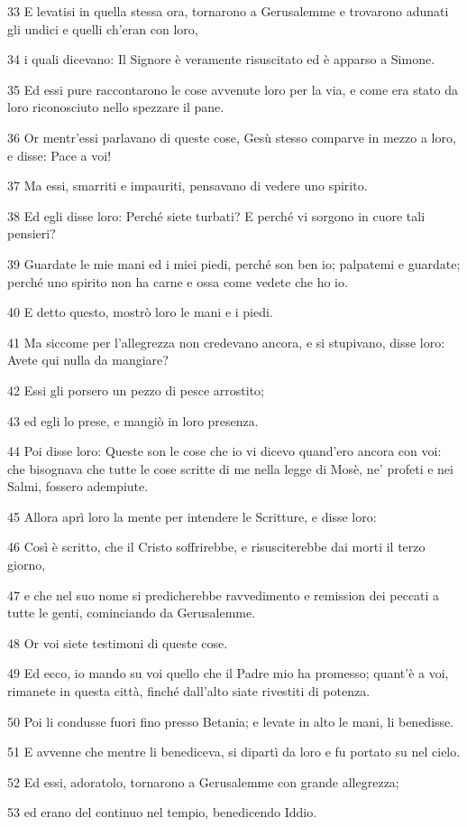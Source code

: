 \par 33 E levatisi in quella stessa ora, tornarono a Gerusalemme e trovarono adunati gli undici e quelli ch'eran con loro,
\par 34 i quali dicevano: Il Signore è veramente risuscitato ed è apparso a Simone.
\par 35 Ed essi pure raccontarono le cose avvenute loro per la via, e come era stato da loro riconosciuto nello spezzare il pane.
\par 36 Or mentr'essi parlavano di queste cose, Gesù stesso comparve in mezzo a loro, e disse: Pace a voi!
\par 37 Ma essi, smarriti e impauriti, pensavano di vedere uno spirito.
\par 38 Ed egli disse loro: Perché siete turbati? E perché vi sorgono in cuore tali pensieri?
\par 39 Guardate le mie mani ed i miei piedi, perché son ben io; palpatemi e guardate; perché uno spirito non ha carne e ossa come vedete che ho io.
\par 40 E detto questo, mostrò loro le mani e i piedi.
\par 41 Ma siccome per l'allegrezza non credevano ancora, e si stupivano, disse loro: Avete qui nulla da mangiare?
\par 42 Essi gli porsero un pezzo di pesce arrostito;
\par 43 ed egli lo prese, e mangiò in loro presenza.
\par 44 Poi disse loro: Queste son le cose che io vi dicevo quand'ero ancora con voi: che bisognava che tutte le cose scritte di me nella legge di Mosè, ne' profeti e nei Salmi, fossero adempiute.
\par 45 Allora aprì loro la mente per intendere le Scritture, e disse loro:
\par 46 Così è scritto, che il Cristo soffrirebbe, e risusciterebbe dai morti il terzo giorno,
\par 47 e che nel suo nome si predicherebbe ravvedimento e remission dei peccati a tutte le genti, cominciando da Gerusalemme.
\par 48 Or voi siete testimoni di queste cose.
\par 49 Ed ecco, io mando su voi quello che il Padre mio ha promesso; quant'è a voi, rimanete in questa città, finché dall'alto siate rivestiti di potenza.
\par 50 Poi li condusse fuori fino presso Betania; e levate in alto le mani, li benedisse.
\par 51 E avvenne che mentre li benediceva, si dipartì da loro e fu portato su nel cielo.
\par 52 Ed essi, adoratolo, tornarono a Gerusalemme con grande allegrezza;
\par 53 ed erano del continuo nel tempio, benedicendo Iddio.


